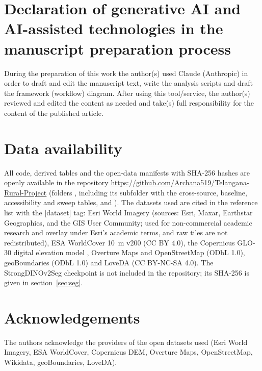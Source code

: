 \documentclass[preprint,12pt]{elsarticle}
\newcommand{\dinoseg}{StrongDINOv2Seg}
\begin{document}
\section*{Declaration of generative AI and AI-assisted technologies in the manuscript preparation process}
During the preparation of this work the author(s) used Claude (Anthropic) in order to draft and edit the manuscript text, write the analysis scripts and draft the framework (workflow) diagram. After using this tool/service, the author(s) reviewed and edited the content as needed and take(s) full responsibility for the content of the published article.

\section*{Data availability}
All code, derived tables and the open-data manifests with SHA-256 hashes are openly available in the repository \url{https://github.com/Archana519/Telangana-Rural-Project} (folders , including its  subfolder with the cross-source, baseline, accessibility and sweep tables, and ). The datasets used are cited in the reference list with the [dataset] tag: Esri World Imagery \cite{esri2026worldimagery} (sources: Esri, Maxar, Earthstar Geographics, and the GIS User Community; used for non-commercial academic research and overlay under Esri's academic terms, and raw tiles are not redistributed), ESA WorldCover 10~m v200 \cite{zanaga2021worldcover} (CC BY 4.0), the Copernicus GLO-30 digital elevation model \cite{esa2022copdem}, Overture Maps \cite{overture2026} and OpenStreetMap (ODbL 1.0), geoBoundaries \cite{runfola2020geoboundaries} (ODbL 1.0) and LoveDA \cite{ds_loveda} (CC BY-NC-SA 4.0). The \dinoseg{} checkpoint is not included in the repository; its SHA-256 is given in section~\ref{sec:seg}.

\section*{Acknowledgements}
The authors acknowledge the providers of the open datasets used (Esri World Imagery, ESA WorldCover, Copernicus DEM, Overture Maps, OpenStreetMap, Wikidata, geoBoundaries, LoveDA).



\end{document}
